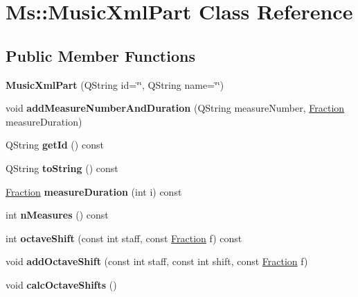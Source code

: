 \hypertarget{class_ms_1_1_music_xml_part}{}\section{Ms\+:\+:Music\+Xml\+Part Class Reference}
\label{class_ms_1_1_music_xml_part}
\subsection*{Public Member Functions}
\begin{DoxyCompactItemize}
\item 
\mbox{\label{class_ms_1_1_music_xml_part_ad236ea93d986caaa709ce67f491a85ee}} 
{\bfseries Music\+Xml\+Part} (Q\+String id=\char`\"{}\char`\"{}, Q\+String name=\char`\"{}\char`\"{})
\item 
\mbox{\label{class_ms_1_1_music_xml_part_a977be74bf8f1f17e4b4cbf0acd1a2742}} 
void {\bfseries add\+Measure\+Number\+And\+Duration} (Q\+String measure\+Number, \hyperlink{class_ms_1_1_fraction}{Fraction} measure\+Duration)
\item 
\mbox{\label{class_ms_1_1_music_xml_part_acf7310ae4b3a4521bf2c05e4903f38f6}} 
Q\+String {\bfseries get\+Id} () const
\item 
\mbox{\label{class_ms_1_1_music_xml_part_abb2ec10b904f26f72d2e63dcc2fd8a53}} 
Q\+String {\bfseries to\+String} () const
\item 
\mbox{\label{class_ms_1_1_music_xml_part_a1a9a7ed7ba10e13feca222358ae90f8f}} 
\hyperlink{class_ms_1_1_fraction}{Fraction} {\bfseries measure\+Duration} (int i) const
\item 
\mbox{\label{class_ms_1_1_music_xml_part_a42fc4d86a192e186b9635b0b0d02db75}} 
int {\bfseries n\+Measures} () const
\item 
\mbox{\label{class_ms_1_1_music_xml_part_a1d020754bf1d522752cc9ef31cb483a9}} 
int {\bfseries octave\+Shift} (const int staff, const \hyperlink{class_ms_1_1_fraction}{Fraction} f) const
\item 
\mbox{\label{class_ms_1_1_music_xml_part_a3f748ae8ba04c9ceb0601c3ed5077456}} 
void {\bfseries add\+Octave\+Shift} (const int staff, const int shift, const \hyperlink{class_ms_1_1_fraction}{Fraction} f)
\item 
\mbox{\label{class_ms_1_1_music_xml_part_ac12308b3f71f79b74de1b6aafc99be18}} 
void {\bfseries calc\+Octave\+Shifts} ()
\end{DoxyCompactItemize}

